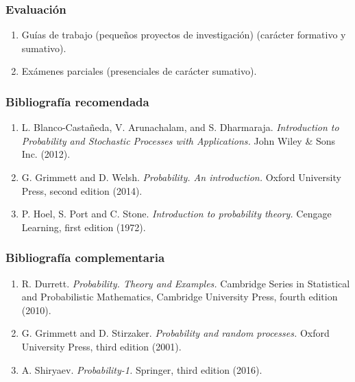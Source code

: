 \begin{refsection}
\subsubsection*{Evaluación}

\begin{enumerate}
\item Guías de trabajo (pequeños proyectos de investigación) (carácter formativo y sumativo).
\item Exámenes parciales (presenciales de carácter sumativo).
\end{enumerate}

\subsubsection*{Bibliografía recomendada}

\begin{enumerate}
\item L. Blanco-Castañeda, V. Arunachalam, and S. Dharmaraja. \emph{Introduction to Probability and Stochastic Processes with Applications.} John Wiley \& Sons Inc. (2012).
\item G. Grimmett and D. Welsh. \emph{Probability. An introduction.} Oxford University Press, second edition (2014).
\item P. Hoel, S. Port and C. Stone. \emph{Introduction to probability theory.} Cengage Learning, first edition (1972).
\end{enumerate}

\subsubsection*{Bibliografía complementaria}

\begin{enumerate}
\item R. Durrett. \emph{Probability. Theory and Examples.} Cambridge Series in Statistical and Probabilistic Mathematics, Cambridge University Press, fourth edition (2010).
\item G. Grimmett and D. Stirzaker. \emph{Probability and random processes.} Oxford University Press, third edition (2001).
\item A. Shiryaev. \emph{Probability-1.} Springer, third edition (2016).
\end{enumerate}

\end{refsection}
